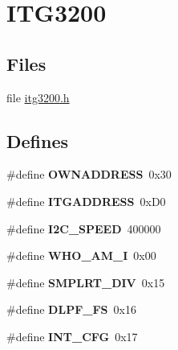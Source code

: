\hypertarget{group___i_t_g3200}{
\section{ITG3200}
\label{group___i_t_g3200}
}
\subsection*{Files}
\begin{DoxyCompactItemize}
\item 
file \hyperlink{itg3200_8h}{itg3200.h}
\end{DoxyCompactItemize}
\subsection*{Defines}
\begin{DoxyCompactItemize}
\item 
\hypertarget{group___i_t_g3200_gaccd0e3058fa80402627f20cc2e77899c}{
\#define {\bfseries OWNADDRESS}~0x30}
\label{group___i_t_g3200_gaccd0e3058fa80402627f20cc2e77899c}

\item 
\hypertarget{group___i_t_g3200_ga236f99f41fad77c0a080986817aacc8d}{
\#define {\bfseries ITGADDRESS}~0xD0}
\label{group___i_t_g3200_ga236f99f41fad77c0a080986817aacc8d}

\item 
\hypertarget{group___i_t_g3200_ga410dc1e7572425a449b5dc0f7ca9f69d}{
\#define {\bfseries I2C\_\-SPEED}~400000}
\label{group___i_t_g3200_ga410dc1e7572425a449b5dc0f7ca9f69d}

\item 
\hypertarget{group___i_t_g3200_ga9fcb9e460d175bfc7ab4d80bf788b43a}{
\#define {\bfseries WHO\_\-AM\_\-I}~0x00}
\label{group___i_t_g3200_ga9fcb9e460d175bfc7ab4d80bf788b43a}

\item 
\hypertarget{group___i_t_g3200_ga7119c37e38b6736096ea1565459043ba}{
\#define {\bfseries SMPLRT\_\-DIV}~0x15}
\label{group___i_t_g3200_ga7119c37e38b6736096ea1565459043ba}

\item 
\hypertarget{group___i_t_g3200_gad4fcaa1e53f084e4124b7101d3e41fb7}{
\#define {\bfseries DLPF\_\-FS}~0x16}
\label{group___i_t_g3200_gad4fcaa1e53f084e4124b7101d3e41fb7}

\item 
\hypertarget{group___i_t_g3200_ga543d8c8b543747d23abd0a5ab3e83773}{
\#define {\bfseries INT\_\-CFG}~0x17}
\label{group___i_t_g3200_ga543d8c8b543747d23abd0a5ab3e83773}


\end{DoxyCompactItemize}
